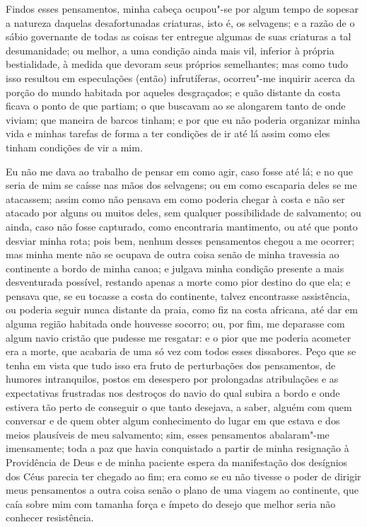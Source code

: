 Findos esses pensamentos, minha cabeça ocupou"-se por algum tempo de
sopesar a natureza daquelas desafortunadas criaturas, isto é, os
selvagens; e a razão de o sábio governante de todas as coisas ter
entregue algumas de suas criaturas a tal desumanidade; ou melhor, a uma
condição ainda mais vil, inferior à própria bestialidade, à medida que
devoram seus próprios semelhantes; mas como tudo isso resultou em
especulações (então) infrutíferas, ocorreu"-me inquirir acerca da porção
do mundo habitada por aqueles desgraçados; e quão distante da costa
ficava o ponto de que partiam; o que buscavam ao se alongarem tanto de
onde viviam; que maneira de barcos tinham; e por que eu não poderia
organizar minha vida e minhas tarefas de forma a ter condições de ir até
lá assim como eles tinham condições de vir a mim.

Eu não me dava ao trabalho de pensar em como agir, caso fosse até lá; e
no que seria de mim se caísse nas mãos dos selvagens; ou em como
escaparia deles se me atacassem; assim como não pensava em como poderia
chegar à costa e não ser atacado por alguns ou muitos deles, sem
qualquer possibilidade de salvamento; ou ainda, caso não fosse
capturado, como encontraria mantimento, ou até que ponto desviar minha
rota; pois bem, nenhum desses pensamentos chegou a me ocorrer; mas minha
mente não se ocupava de outra coisa senão de minha travessia ao
continente a bordo de minha canoa; e julgava minha condição presente a
mais desventurada possível, restando apenas a morte como pior destino do
que ela; e pensava que, se eu tocasse a costa do continente, talvez
encontrasse assistência, ou poderia seguir nunca distante da praia, como
fiz na costa africana, até dar em alguma região habitada onde houvesse
socorro; ou, por fim, me deparasse com algum navio cristão que pudesse
me resgatar: e o pior que me poderia acometer era a morte, que acabaria
de uma só vez com todos esses dissabores. Peço que se tenha em vista que
tudo isso era fruto de perturbações dos pensamentos, de humores
intranquilos, postos em desespero por prolongadas atribulações e as
expectativas frustradas nos destroços do navio do qual subira a bordo e
onde estivera tão perto de conseguir o que tanto desejava, a saber,
alguém com quem conversar e de quem obter algum conhecimento do lugar em
que estava e dos meios plausíveis de meu salvamento; sim, esses
pensamentos abalaram"-me imensamente; toda a paz que havia conquistado a
partir de minha resignação à Providência de Deus e de minha paciente
espera da manifestação dos desígnios dos Céus parecia ter chegado ao
fim; era como se eu não tivesse o poder de dirigir meus pensamentos a
outra coisa senão o plano de uma viagem ao continente, que caía sobre
mim com tamanha força e ímpeto do desejo que melhor seria não conhecer
resistência.

